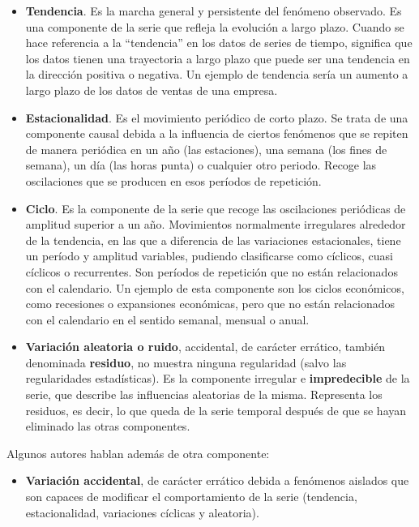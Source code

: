 \documentclass[]{book}
\providecommand{\tightlist}{%
  \setlength{\itemsep}{0pt}\setlength{\parskip}{0pt}}
\begin{document}
\begin{itemize}
\item
  \textbf{Tendencia}. Es la marcha general y persistente del fenómeno
  observado. Es una componente de la serie que refleja la evolución a
  largo plazo. Cuando se hace referencia a la ``tendencia'' en los datos
  de series de tiempo, significa que los datos tienen una trayectoria a
  largo plazo que puede ser una tendencia en la dirección positiva o
  negativa. Un ejemplo de tendencia sería un aumento a largo plazo de
  los datos de ventas de una empresa.
\item
  \textbf{Estacionalidad}. Es el movimiento periódico de corto plazo. Se
  trata de una componente causal debida a la influencia de ciertos
  fenómenos que se repiten de manera periódica en un año (las
  estaciones), una semana (los fines de semana), un día (las horas
  punta) o cualquier otro periodo. Recoge las oscilaciones que se
  producen en esos períodos de repetición.
\item
  \textbf{Ciclo}. Es la componente de la serie que recoge las
  oscilaciones periódicas de amplitud superior a un año. Movimientos
  normalmente irregulares alrededor de la tendencia, en las que a
  diferencia de las variaciones estacionales, tiene un período y
  amplitud variables, pudiendo clasificarse como cíclicos, cuasi
  cíclicos o recurrentes. Son períodos de repetición que no están
  relacionados con el calendario. Un ejemplo de esta componente son los
  ciclos económicos, como recesiones o expansiones económicas, pero que
  no están relacionados con el calendario en el sentido semanal, mensual
  o anual.
\item
  \textbf{Variación aleatoria o ruido}, accidental, de carácter
  errático, también denominada \textbf{residuo}, no muestra ninguna
  regularidad (salvo las regularidades estadísticas). Es la componente
  irregular e \textbf{impredecible} de la serie, que describe las
  influencias aleatorias de la misma. Representa los residuos, es decir,
  lo que queda de la serie temporal después de que se hayan eliminado
  las otras componentes.
\end{itemize}

Algunos autores hablan además de otra componente:

\begin{itemize}
\tightlist
\item
  \textbf{Variación accidental}, de carácter errático debida a fenómenos
  aislados que son capaces de modificar el comportamiento de la serie
  (tendencia, estacionalidad, variaciones cíclicas y aleatoria).
\end{itemize}
\end{document}
